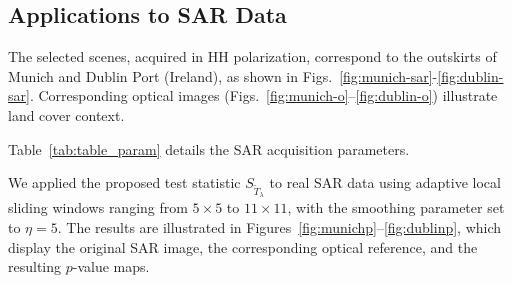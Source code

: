 \documentclass[
  lettersize  journal,
]{IEEEtran}%
\begin{document}
\subsection{Applications to SAR Data}\label{applications-to-sar-data}

The selected scenes, acquired in HH polarization, correspond to the
outskirts of Munich and Dublin Port (Ireland), as shown in
Figs.~\ref{fig:munich-sar}-\ref{fig:dublin-sar}. Corresponding optical
images (Figs.~\ref{fig:munich-o}--\ref{fig:dublin-o}) illustrate land
cover context.

Table~\ref{tab:table_param} details the SAR acquisition parameters.
\renewcommand{\arraystretch}{2.5}

\begin{table}[H]
\centering\centering
\caption{\label{tab:table_param}Parameters of selected SAR images}
\centering
{}
\end{table}

We applied the proposed test statistic \(S_{\widetilde{T}_{\lambda}}\)
to real SAR data using adaptive local sliding windows ranging from
\(5 \times 5\) to \(11 \times 11\), with the smoothing parameter set to
\(\eta = 5\). The results are illustrated in
Figures~\ref{fig:munichp}--\ref{fig:dublinp}, which display the original
SAR image, the corresponding optical reference, and the resulting
\(p\)-value maps.
\end{document}
